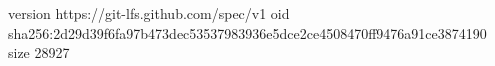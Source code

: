version https://git-lfs.github.com/spec/v1
oid sha256:2d29d39f6fa97b473dec53537983936e5dce2ce4508470ff9476a91ce3874190
size 28927
